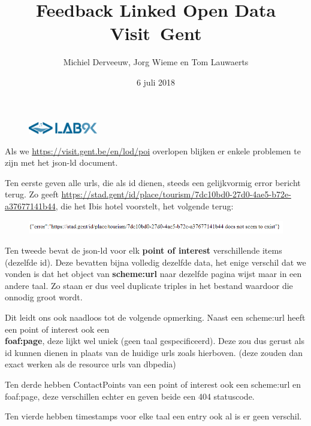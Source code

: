 \documentclass[11pt, letterpaper, oneside]{article}
\title{Feedback Linked Open Data\\\mbox{Visit Gent}}
\author{Michiel Derveeuw, Jorg Wieme en Tom Lauwaerts}
\date{6 juli 2018}
\begin{document}
	\begin{figure}
			\includegraphics[width=0.27\textwidth,keepaspectratio]{figuren/logo} %
	\end{figure}
	\vspace*{0.35cm}
	
	\makeatletter\fontsize{30pt}{28pt}\selectfont\textcolor{priColour}{\textbf{\@title}}\makeatother
	\newline
	
	\fontsize{11pt}{15pt}\selectfont
	Als we \url{https://visit.gent.be/en/lod/poi} overlopen blijken er enkele problemen te zijn met het json-ld document.
	
	Ten eerste geven alle urls, die als id dienen, steeds een gelijkvormig error bericht terug.
	Zo geeft \url{https://stad.gent/id/place/tourism/7dc10bd0-27d0-4ae5-b72e-a37677141b44}, die het Ibis hotel voorstelt, het volgende terug:
	
	\begin{figure}[!h]
		\centering
		\includegraphics[width=\linewidth]{figuren/error}
	\end{figure}

	Ten tweede bevat de json-ld voor elk \textbf{point of interest} verschillende items (dezelfde id). Deze bevatten bijna volledig dezelfde data, het enige verschil dat we vonden is dat het object van \textbf{scheme:url} naar dezelfde pagina wijst maar in een andere taal. Zo staan er dus veel duplicate triples in het bestand waardoor die onnodig groot wordt.
	
	Dit leidt ons ook naadloos tot de volgende opmerking. Naast een scheme:url heeft een point of interest ook een \\\textbf{foaf:page}, deze lijkt wel uniek (geen taal gespecificeerd). Deze zou dus gerust als id kunnen dienen in plaats van de huidige urls zoals hierboven. (deze zouden dan exact werken als de resource urls van dbpedia)

	Ten derde hebben ContactPoints van een point of interest ook een scheme:url en \\foaf:page, deze verschillen echter en geven beide een 404 statuscode.
	
	Ten vierde hebben timestamps voor elke taal een entry ook al is er geen verschil.
	
\end{document}
